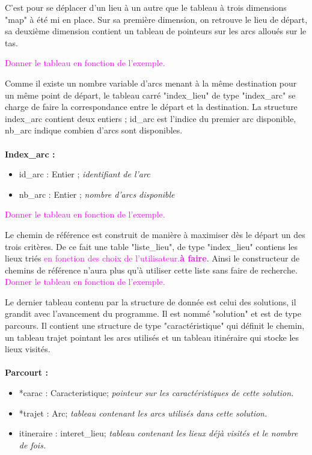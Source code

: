     C'est pour se déplacer d'un lieu à un autre que le tableau à trois dimensions "map" à été mi en place. Sur sa première dimension, on retrouve le lieu de départ, sa deuxième dimension contient un tableau de pointeurs sur les arcs alloués sur le tas.

    \textcolor{magenta}{Donner le tableau en fonction de l'exemple.}

    Comme il existe un nombre variable d'arcs menant à la même destination pour un même point de départ, le tableau carré "index\_lieu" de type "index\_arc" se charge de faire la correspondance entre le départ et la destination.
    La structure index\_arc contient deux entiers ; id\_arc est l'indice du premier arc disponible, nb\_arc indique combien d'arcs sont disponibles.\\
    \\
    \textbf{Index\_arc :}
    \begin{itemize}
      \item id\_arc : Entier ; \textit{identifiant de l'arc}
      \item nb\_arc : Entier ; \textit{nombre d'arcs disponible}
    \end{itemize}

    \textcolor{magenta}{Donner le tableau en fonction de l'exemple.}

    Le chemin de référence est construit de manière à maximiser dès le départ un des trois critères. De ce fait une table "liste\_lieu", de type "index\_lieu" contiens les lieux triés \textcolor{magenta}{en fonction des choix de l'utilisateur.\textbf{à faire}}. Ainsi le constructeur de chemins de référence n'aura plus qu'à utiliser cette liste sans faire de recherche.
    \textcolor{magenta}{Donner le tableau en fonction de l'exemple.}

    Le dernier tableau contenu par la structure de donnée est celui des solutions, il grandit avec l'avancement du programme. Il est nommé "solution" et est de type parcours. Il contient une structure de type "caractéristique" qui définit le chemin, un tableau trajet pointant les arcs utilisés et un tableau itinéraire qui stocke les lieux visités. \\
    \\
    \textbf{Parcourt :}
    \begin{itemize}
      \item *carac : Caracteristique; \textit{pointeur sur les caractéristiques de cette solution.}
      \item *trajet : Arc; \textit{tableau contenant les arcs utilisés dans cette solution.}
      \item itineraire : interet\_lieu; \textit{tableau contenant les lieux déjà visités et le nombre de fois.}
    \end{itemize}